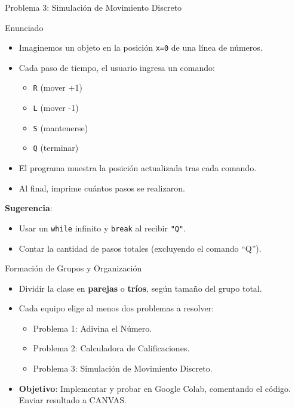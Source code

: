 \documentclass[10pt]{beamer}
\begin{document}
\begin{frame}{Problema 3: Simulación de Movimiento Discreto}
  \begin{block}{Enunciado}
    \begin{itemize}
      \item Imaginemos un objeto en la posición \texttt{x=0} de una línea de números.
      \item Cada paso de tiempo, el usuario ingresa un comando:
        \begin{itemize}
          \item \texttt{R} (mover +1)
          \item \texttt{L} (mover -1)
          \item \texttt{S} (mantenerse)
          \item \texttt{Q} (terminar)
        \end{itemize}
      \item El programa muestra la posición actualizada tras cada comando.
      \item Al final, imprime cuántos pasos se realizaron.
    \end{itemize}
  \end{block}
  \textbf{Sugerencia}:
  \begin{itemize}
    \item Usar un \texttt{while} infinito y \texttt{break} al recibir \texttt{"Q"}.
    \item Contar la cantidad de pasos totales (excluyendo el comando “Q”).
  \end{itemize}
\end{frame}

\begin{frame}{Formación de Grupos y Organización}
  \begin{itemize}
    \item Dividir la clase en \textbf{parejas} o \textbf{tríos}, según tamaño del grupo total.
    \item Cada equipo elige al menos dos problemas a resolver:
      \begin{itemize}
        \item Problema 1: Adivina el Número.
        \item Problema 2: Calculadora de Calificaciones.
        \item Problema 3: Simulación de Movimiento Discreto.
      \end{itemize}
    \item \textbf{Objetivo}: Implementar y probar en Google Colab, comentando el código. Enviar resultado a CANVAS.
  \end{itemize}
\end{frame}
\end{document}
